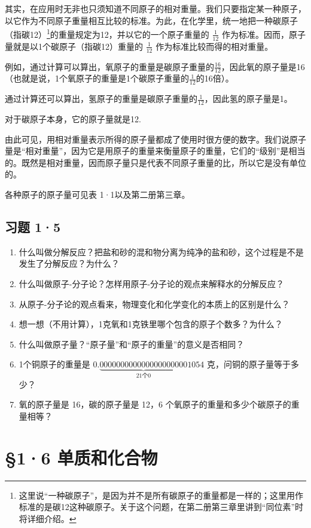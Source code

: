 其实，在应用时无非也只须知道不同原子的相对重量。我们只要指定某一种原子，以它作为不同原子重量相互比较的标准。为此，在化学里，统一地把一种碳原子（指碳12）\footnote{这里说``一种碳原子''，是因为并不是所有碳原子的重量都是一样的；这里用作标准的是碳12这种碳原子。关于这个问题，在第二册第三章里讲到``同位素''时将详细介绍。}的重量规定为12，并以它的一个原子重量的
\(\frac{1}{12}\) 作为标准。因而，原子量就是以1个碳原子（指碳12）重量的
\(\frac{1}{12}\) 作为标准比较而得的相对重量。

例如，通过计算可以算出，氧原子的重量是碳原子重量的\(\frac{16}{12}\)，因此氧的原子量是16（也就是说，1个氧原子的重量是1个碳原子重量的\(\frac{1}{12}\)的16倍）。

通过计算还可以算出，氢原子的重量是碳原子重量的\(\frac{1}{12}\)，因此氢的原子量是1。

对于碳原子本身，它的原子量就是12.

由此可见，用相对重量表示所得的原子量都成了使用时很方便的数字。我们说原子量是``相对重量''，因为它是用原子的重量来衡量原子的重量，它们的``级别''是相当的。既然是相对重量，因而原子量只是代表不同原子重量的比，所以它是没有单位的。

各种原子的原子量可见表 1·1以及第二册第三章。

\subsection{习题 1·5}

\begin{enumerate}
\item
  什么叫做分解反应？把盐和砂的混和物分离为纯净的盐和砂，这个过程是不是发生了分解反应？为什么？
\item
  什么叫做原子-分子论？怎样用原子-分子论的观点来解释水的分解反应？
\item
  从原子-分子论的观点看来，物理变化和化学变化的本质上的区别是什么？
\item
  想一想（不用计算），1克氧和1克铁里哪个包含的原子个数多？为什么？
\item
  什么叫做原子量？``原子量''和``原子的重量''的意义是否相同？
\item
  1个铜原子的重量是
  \(0.\underbrace{000000000000000000000}_{21\text{个}0}1054\)
  克，问铜的原子量等于多少？
\item
  氧的原子量是 16，碳的原子量是 12，6
  个氧原子的重量和多少个碳原子的重量相等？
\end{enumerate}

\section{§1·6 单质和化合物}

